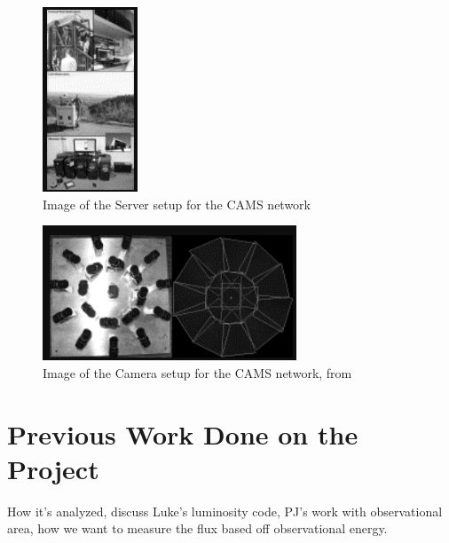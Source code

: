 \begin{figure}
    \centering
    \includegraphics[scale=1.5]{CAMS-Server-Setup.png}
    \caption{Image of the Server setup for the CAMS network}
    \label{Figure 4}
\end{figure}

\begin{figure}
    \centering
    \includegraphics[scale=1.5]{CAMS-Camera-Setup.png}
    \caption{Image of the Camera setup for the CAMS network, from}
    \label{Figure 5}
\end{figure}


\section{Previous Work Done on the Project}

How it's analyzed, discuss Luke's luminosity code, PJ's work with observational area, how we want to measure the flux based off observational energy.